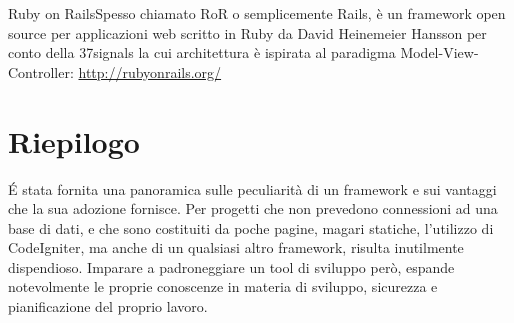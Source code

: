 \begin{deftab}{Ruby on Rails}{Spesso chiamato RoR o semplicemente Rails, è un framework open source per applicazioni web scritto in Ruby da David Heinemeier Hansson per conto della 37signals la cui architettura è ispirata al paradigma Model-View-Controller: \url{http://rubyonrails.org/}}
\end{deftab}

\section{Riepilogo}
\'E stata fornita una panoramica sulle peculiarità  di un framework e sui vantaggi che la sua adozione fornisce. Per progetti che non prevedono connessioni ad una base di dati, e che sono costituiti da poche pagine, magari statiche, l'utilizzo di CodeIgniter, ma anche di un qualsiasi altro framework, risulta inutilmente dispendioso. Imparare a padroneggiare un tool di sviluppo però, espande notevolmente le proprie conoscenze in materia di sviluppo, sicurezza e pianificazione del proprio lavoro.